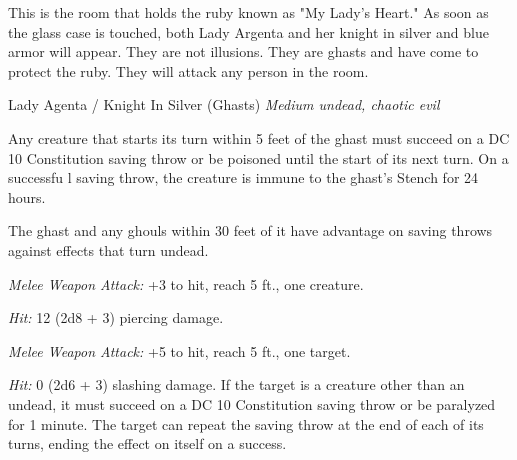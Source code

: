 \documentclass[palace_of_the_silver_princess]{subfiles}
\begin{document}
This is the room that holds the ruby known as "My Lady’s Heart." As soon
as the glass case is touched, both Lady Argenta and her knight in silver
and blue armor will appear. They are not illusions. They are ghasts 
and have come to protect the ruby. They will attack any person in the
room. 

\begin{monsterbox}{Lady Agenta / Knight In Silver (Ghasts)}
	\textit{Medium undead, chaotic evil}\\
	\hline
	\basics[
		armorclass = {13},
		hitpoints = {36 (8d8)},
		speed = {30~ft.}]
	\hline
	\stats[
		STR = \stat{16},
		DEX = \stat{17},
		CON = \stat{10},
		INT = \stat{11},
		WIS = \stat{10},
		CHA = \stat{8}]
	\hline
	\details[
        damageresistances = {necrotic},
        damageimmunities = {poison},
        conditionimmunities = {charmed, exhaustion, poisoned},
		senses = {darkvision 60~ft.passive Perception 10},
		languages = {Common},
		challenge = {2 (450 XP)}]
	\hline
	\begin{monsteraction}[Stench]
        Any creature that starts its turn within 5 feet of the ghast
        must succeed on a DC 10 Constitution saving throw or be poisoned
        until the start of its next turn. On a successfu l saving throw,
        the creature is immune to the ghast's Stench for 24 hours.
	\end{monsteraction}

    \begin{monsteraction}
        The ghast and any ghouls within 30 feet of it have advantage on
        saving throws against effects that turn undead.
    \end{monsteraction}

    \begin{monsteraction}[Bite]
		\textit{Melee Weapon Attack:} +3 to hit, reach 5 ft., one
        creature.

        \textit{Hit:} 12 (2d8 + 3) piercing damage.
	\end{monsteraction}

    \begin{monsteraction}[Claws]
		\textit{Melee Weapon Attack:} +5 to hit, reach 5 ft., one
        target.

        \textit{Hit:} 0 (2d6 + 3) slashing damage. If the target is a
        creature other than an undead, it must succeed on a DC 10
        Constitution saving throw or be paralyzed for 1 minute. The
        target can repeat the saving throw at the end of each of its
        turns, ending the effect on itself on a success.
	\end{monsteraction}
\end{monsterbox}
\end{document}
